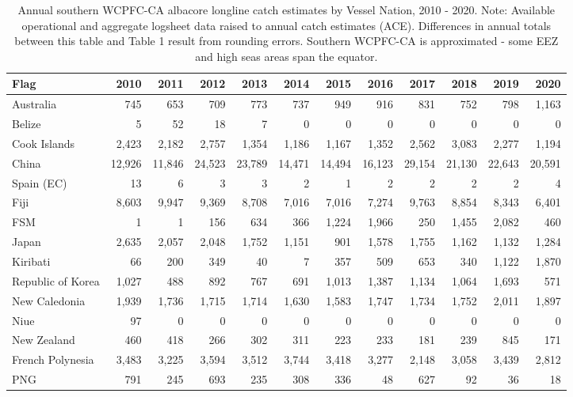 \begin{longtable}{lrrrrrrrrrrr}
\caption{Annual southern WCPFC-CA albacore longline catch estimates by Vessel Nation, 2010 - 2020. Note: Available operational and aggregate logsheet data raised to annual catch estimates (ACE). Differences in annual totals between this table and Table 1 result from rounding errors. Southern WCPFC-CA is approximated - some EEZ and high seas areas span the equator.} \\ 
  \hline
Flag & 2010 & 2011 & 2012 & 2013 & 2014 & 2015 & 2016 & 2017 & 2018 & 2019 & 2020 \\ 
  \hline
Australia & 745 & 653 & 709 & 773 & 737 & 949 & 916 & 831 & 752 & 798 & 1,163 \\ 
  Belize & 5 & 52 & 18 & 7 & 0 & 0 & 0 & 0 & 0 & 0 & 0 \\ 
  Cook Islands & 2,423 & 2,182 & 2,757 & 1,354 & 1,186 & 1,167 & 1,352 & 2,562 & 3,083 & 2,277 & 1,194 \\ 
  China & 12,926 & 11,846 & 24,523 & 23,789 & 14,471 & 14,494 & 16,123 & 29,154 & 21,130 & 22,643 & 20,591 \\ 
  Spain (EC) & 13 & 6 & 3 & 3 & 2 & 1 & 2 & 2 & 2 & 2 & 4 \\ 
  Fiji & 8,603 & 9,947 & 9,369 & 8,708 & 7,016 & 7,016 & 7,274 & 9,763 & 8,854 & 8,343 & 6,401 \\ 
  FSM & 1 & 1 & 156 & 634 & 366 & 1,224 & 1,966 & 250 & 1,455 & 2,082 & 460 \\ 
  Japan & 2,635 & 2,057 & 2,048 & 1,752 & 1,151 & 901 & 1,578 & 1,755 & 1,162 & 1,132 & 1,284 \\ 
  Kiribati & 66 & 200 & 349 & 40 & 7 & 357 & 509 & 653 & 340 & 1,122 & 1,870 \\ 
  Republic of Korea & 1,027 & 488 & 892 & 767 & 691 & 1,013 & 1,387 & 1,134 & 1,064 & 1,693 & 571 \\ 
  New Caledonia & 1,939 & 1,736 & 1,715 & 1,714 & 1,630 & 1,583 & 1,747 & 1,734 & 1,752 & 2,011 & 1,897 \\ 
  Niue & 97 & 0 & 0 & 0 & 0 & 0 & 0 & 0 & 0 & 0 & 0 \\ 
  New Zealand & 460 & 418 & 266 & 302 & 311 & 223 & 233 & 181 & 239 & 845 & 171 \\ 
  French Polynesia & 3,483 & 3,225 & 3,594 & 3,512 & 3,744 & 3,418 & 3,277 & 2,148 & 3,058 & 3,439 & 2,812 \\ 
  PNG & 791 & 245 & 693 & 235 & 308 & 336 & 48 & 627 & 92 & 36 & 18 \\ 

\end{longtable}
